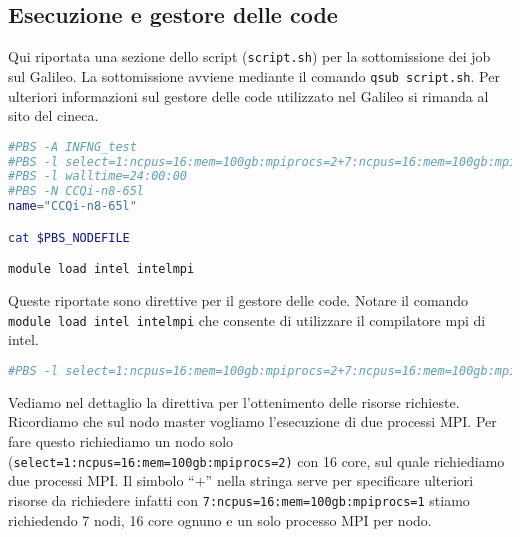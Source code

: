 \subsection{Esecuzione e gestore delle code}
Qui riportata una sezione dello script (\texttt{script.sh}) per la sottomissione dei job sul Galileo.
La sottomissione avviene mediante il comando \texttt{qsub script.sh}. Per ulteriori informazioni
sul gestore delle code utilizzato nel Galileo si rimanda al sito del
cineca.
\begin{lstlisting}[language=bash]
#PBS -A INFNG_test 
#PBS -l select=1:ncpus=16:mem=100gb:mpiprocs=2+7:ncpus=16:mem=100gb:mpiprocs=1 
#PBS -l walltime=24:00:00 
#PBS -N CCQi-n8-65l
name="CCQi-n8-65l"

cat $PBS_NODEFILE

module load intel intelmpi
\end{lstlisting}
Queste riportate sono direttive per il gestore delle code. Notare il
comando \texttt{module load intel intelmpi} che consente di utilizzare il 
compilatore mpi di intel. 
\begin{lstlisting}[language=bash]
#PBS -l select=1:ncpus=16:mem=100gb:mpiprocs=2+7:ncpus=16:mem=100gb:mpiprocs=1 
\end{lstlisting}
Vediamo nel dettaglio la direttiva per l'ottenimento delle risorse
richieste. Ricordiamo che sul nodo master vogliamo l'esecuzione di due processi
MPI. Per fare questo richiediamo un nodo solo (\texttt{select=1:ncpus=16:mem=100gb:mpiprocs=2)} con 16 core, sul quale richiediamo
due processi MPI. Il simbolo ``+'' nella stringa serve per specificare ulteriori risorse da richiedere infatti
con \texttt{7:ncpus=16:mem=100gb:mpiprocs=1} stiamo richiedendo 7
nodi, 16 core ognuno e un solo processo MPI per nodo.
